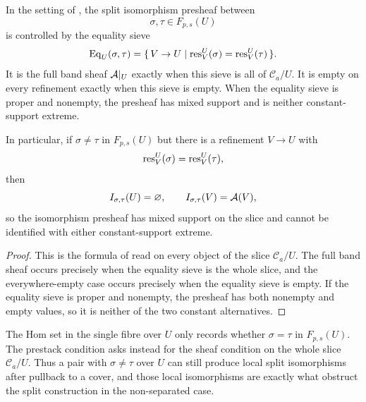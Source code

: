 \begin{proposition}\label{prop:no-fibrewise-split-dichotomy}
In the setting of , the split isomorphism presheaf between
\[
\sigma,\tau\in F_{p,s}(U)
\]
is controlled by the equality sieve
\[
\mathrm{Eq}_U(\sigma,\tau)=\{\,V\to U\mid \mathrm{res}_V^U(\sigma)=\mathrm{res}_V^U(\tau)\,\}.
\]
It is the full band sheaf $\mathcal{A}|_U$ exactly when this sieve is all of
$\mathcal C_a/U$. It is empty on every refinement exactly when this sieve is
empty. When the equality sieve is proper and nonempty, the presheaf has mixed
support and is neither constant-support extreme.

In particular, if $\sigma\neq\tau$ in $F_{p,s}(U)$ but there is a refinement $V\to U$ with
\[
\mathrm{res}_V^U(\sigma)=\mathrm{res}_V^U(\tau),
\]
then
\[
I_{\sigma,\tau}(U)=\varnothing,
\qquad
I_{\sigma,\tau}(V)=\mathcal{A}(V),
\]
so the isomorphism presheaf has mixed support on the slice and cannot be
identified with either constant-support extreme.
\end{proposition}

\begin{proof}
This is the formula of  read on every object of the slice $\mathcal C_a/U$. The full band sheaf occurs precisely when the equality sieve is the whole slice, and the everywhere-empty case occurs precisely when the equality sieve is empty. If the equality sieve is proper and nonempty, the presheaf has both nonempty and empty values, so it is neither of the two constant alternatives.
\end{proof}

\begin{remark}\label{rem:base-fibre-not-enough}
The Hom set in the single fibre over $U$ only records whether $\sigma=\tau$ in $F_{p,s}(U)$. The prestack condition asks instead for the sheaf condition on the whole slice $\mathcal C_a/U$. Thus a pair with $\sigma\neq\tau$ over $U$ can still produce local split isomorphisms after pullback to a cover, and those local isomorphisms are exactly what obstruct the split construction in the non-separated case.
\end{remark}

